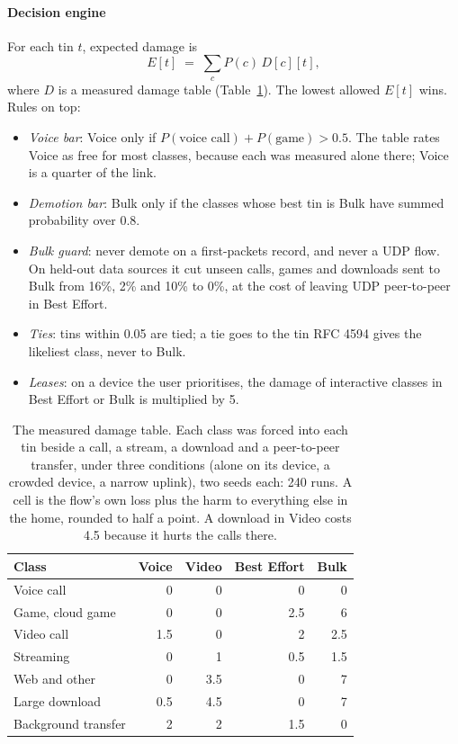 \documentclass[11pt,a4paper]{article}
\begin{document}
\paragraph{Decision engine} For each tin $t$, expected damage is
\[ E[t] \;=\; \sum_{c} P(c)\, D[c][t], \]
where $D$ is a measured damage table (Table~\ref{tab:damage}). The lowest allowed $E[t]$ wins. Rules on top:
\begin{itemize}
\item \emph{Voice bar}: Voice only if $P(\text{voice call}) + P(\text{game}) > 0.5$. The table rates Voice as free for most classes, because each was measured alone there; Voice is a quarter of the link.
\item \emph{Demotion bar}: Bulk only if the classes whose best tin is Bulk have summed probability over 0.8.
\item \emph{Bulk guard}: never demote on a first-packets record, and never a UDP flow. On held-out data sources it cut unseen calls, games and downloads sent to Bulk from 16\%, 2\% and 10\% to 0\%, at the cost of leaving UDP peer-to-peer in Best Effort.
\item \emph{Ties}: tins within 0.05 are tied; a tie goes to the tin RFC 4594 gives the likeliest class, never to Bulk.
\item \emph{Leases}: on a device the user prioritises, the damage of interactive classes in Best Effort or Bulk is multiplied by 5.
\end{itemize}

\begin{table}[H]\centering\small
\begin{tabular}{@{}lrrrr@{}}
\toprule
Class & Voice & Video & Best Effort & Bulk \\
\midrule
Voice call & 0 & 0 & 0 & 0 \\
Game, cloud game & 0 & 0 & 2.5 & 6 \\
Video call & 1.5 & 0 & 2 & 2.5 \\
Streaming & 0 & 1 & 0.5 & 1.5 \\
Web and other & 0 & 3.5 & 0 & 7 \\
Large download & 0.5 & 4.5 & 0 & 7 \\
Background transfer & 2 & 2 & 1.5 & 0 \\
\bottomrule
\end{tabular}
\caption{The measured damage table. Each class was forced into each tin beside a call, a stream, a download and a peer-to-peer transfer, under three conditions (alone on its device, a crowded device, a narrow uplink), two seeds each: 240 runs. A cell is the flow's own loss plus the harm to everything else in the home, rounded to half a point. A download in Video costs 4.5 because it hurts the calls there.}
\label{tab:damage}
\end{table}
\end{document}

